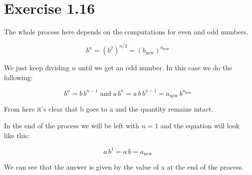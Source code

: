 \section*{Exercise 1.16}

The whole process here depends on the computations for even and odd numbers.

\begin{equation}
	b^n = \left(b^2\right)^{n/2} = \left(b_{\text{new}}\right)^{n_{\text{new}}}
\end{equation}

We just keep dividing $n$ until we get an odd number. In this case we do the following:

\begin{equation}
	b^n = b\,b^{n-1} \; \text{and} \; a\,b^n = a\,b\,b^{n-1} = a_{\text{new}}\,b^{n_{\text{new}}}
\end{equation}

From here it's clear that b goes to a and the quantity remains intact.

In the end of the process we will be left with $n=1$ and the equation will look like this:

\begin{equation}
	a\,b^1 = a\,b = a_{\text{new}}
\end{equation}

We can see that the answer is given by the value of a at the end of the process.
